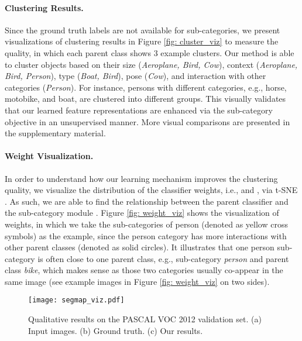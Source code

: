\documentclass[10pt,twocolumn,letterpaper]{article}
\begin{document}
\paragraph{Clustering Results.}
Since the ground truth labels are not available for sub-categories, we present visualizations of clustering results in Figure \ref{fig: cluster_viz} to measure the quality, in which each parent class shows 3 example clusters. 
Our method is able to cluster objects based on their size (\textit{Aeroplane, Bird, Cow}), context (\textit{Aeroplane, Bird, Person}), type (\textit{Boat, Bird}), pose (\textit{Cow}), and interaction with other categories (\textit{Person}).
For instance, persons with different categories, e.g., horse, motobike, and boat, are clustered into different groups.
This visually validates that our learned feature representations are enhanced via the sub-category objective in an unsupervised manner.
More visual comparisons are presented in the supplementary material.




\paragraph{Weight Visualization.}
In order to understand how our learning mechanism improves the clustering quality, we visualize the distribution of the classifier weights, i.e.,  and , via t-SNE \cite{maaten2008visualizing}.
As such, we are able to find the relationship between the parent classifier  and the sub-category module .
Figure \ref{fig: weight_viz} shows the visualization of weights, in which we take the sub-categories of person (denoted as yellow cross symbols) as the example, since the person category has more interactions with other parent classes (denoted as solid circles).
It illustrates that one person sub-category is often close to one parent class, e.g., sub-category \textit{person} and parent class \textit{bike}, which makes sense as those two categories usually co-appear in the same image (see example images in Figure \ref{fig: weight_viz} on two sides).







\begin{figure*}[!t]
	\centering
	\texttt{[image: segmap\_viz.pdf]} \\
	\vspace{-2mm}
	\caption{Qualitative results on the PASCAL VOC 2012 validation set.
	(a) Input images. (b) Ground truth. (c) Our results.
	}
	\label{fig: segmap_viz}
	
\end{figure*}
\end{document}
